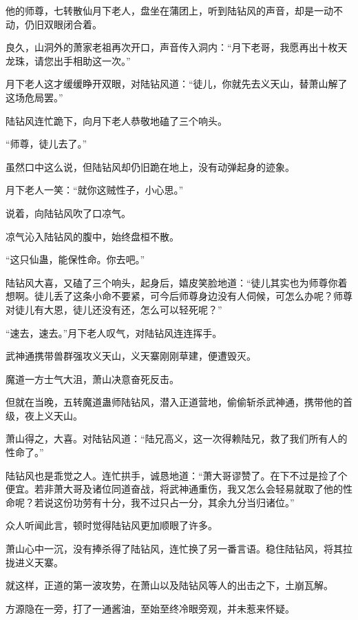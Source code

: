 
\begin{this_body}



他的师尊，七转散仙月下老人，盘坐在蒲团上，听到陆钻风的声音，却是一动不动，仍旧双眼闭合着。

良久，山洞外的萧家老祖再次开口，声音传入洞内：“月下老哥，我愿再出十枚天龙珠，请您出手相助这一次。”

月下老人这才缓缓睁开双眼，对陆钻风道：“徒儿，你就先去义天山，替萧山解了这场危局罢。”

陆钻风连忙跪下，向月下老人恭敬地磕了三个响头。

“师尊，徒儿去了。”

虽然口中这么说，但陆钻风却仍旧跪在地上，没有动弹起身的迹象。

月下老人一笑：“就你这贼性子，小心思。”

说着，向陆钻风吹了口凉气。

凉气沁入陆钻风的腹中，始终盘桓不散。

“这只仙蛊，能保性命。你去吧。”

陆钻风大喜，又磕了三个响头，起身后，嬉皮笑脸地道：“徒儿其实也为师尊你着想啊。徒儿丢了这条小命不要紧，可今后师尊身边没有人伺候，可怎么办呢？师尊对徒儿有大恩，徒儿还没有还，怎么可以轻死呢？”

“速去，速去。”月下老人叹气，对陆钻风连连挥手。

武神通携带兽群强攻义天山，义天寨刚刚草建，便遭毁灭。

魔道一方士气大沮，萧山决意奋死反击。

但就在当晚，五转魔道蛊师陆钻风，潜入正道营地，偷偷斩杀武神通，携带他的首级，夜上义天山。

萧山得之，大喜。对陆钻风道：“陆兄高义，这一次得赖陆兄，救了我们所有人的性命了。”

陆钻风也是乖觉之人。连忙拱手，诚恳地道：“萧大哥谬赞了。在下不过是捡了个便宜。若非萧大哥及诸位同道奋战，将武神通重伤，我又怎么会轻易就取了他的性命呢？若说这份功劳有十分，我不过只占一分，其余九分当归诸位。”

众人听闻此言，顿时觉得陆钻风更加顺眼了许多。

萧山心中一沉，没有捧杀得了陆钻风，连忙换了另一番言语。稳住陆钻风，将其拉拢进义天寨。

就这样，正道的第一波攻势，在萧山以及陆钻风等人的出击之下，土崩瓦解。

方源隐在一旁，打了一通酱油，至始至终冷眼旁观，并未惹来怀疑。


\end{this_body}
